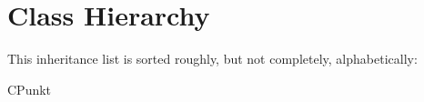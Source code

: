 \section{Class Hierarchy}
This inheritance list is sorted roughly, but not completely, alphabetically:\begin{CompactList}
\item CPunkt\begin{CompactList}
\item {}
\end{CompactList}
\end{CompactList}
